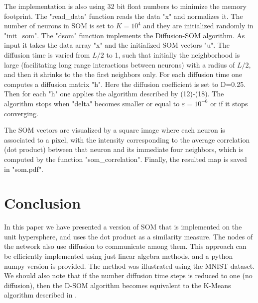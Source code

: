 \documentclass[10pt,english]{article}
\begin{document}
The implementation is also using 32 bit float numbers to minimize the memory footprint. 
The "read\_data" function reads the data "x" and normalizes it. The number of neurons in SOM is set to $K=10^4$ and they are initialized randomly in "init\_som". 
The "dsom" function implements the Diffusion-SOM algorithm. As input it takes the data array "x" and the initialized SOM vectors "u". 
The diffusion time is varied from $L/2$ to 1, such that initially the neighborhood is large (facilitating long range interactions between neurons) with a radius of $L/2$, and then it shrinks to the the first neighbors only. 
For each diffusion time one computes a diffusion matrix "h". Here the diffusion coefficient is set to D=0.25. Then for each "h" one applies the algorithm described by (12)-(18). The algorithm stops when 
"delta" becomes smaller or equal to $\varepsilon = 10^{-6}$ or if it stops converging. 

The SOM vectors are visualized by a square image where each neuron is associated to a pixel, with the intensity corresponding to the average correlation (dot product) between that 
neuron and its immediate four neighbors, which is computed by the function "som\_correlation". Finally, the resulted map is saved in "som.pdf". 



\section*{Conclusion}
In this paper we have presented a version of SOM that is implemented on the unit hypersphere, and uses the dot product as a similarity measure. 
The nodes of the network also use diffusion to communicate among them. This approach can be efficiently implemented using just linear algebra methods, and  
a python numpy version is provided. The method was illustrated using the MNIST dataset. We should also note that 
if the number diffusion time steps is reduced to one (no diffusion), then the D-SOM algorithm becomes equivalent to the K-Means algorithm described in \cite{key-10}. 
\end{document}
